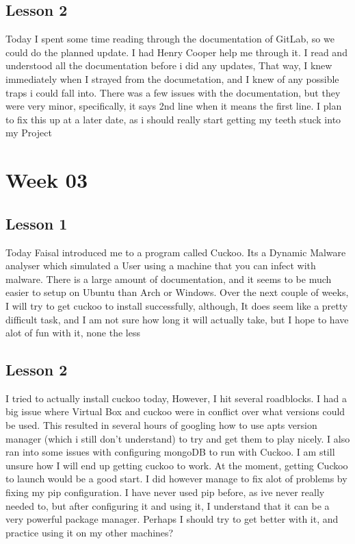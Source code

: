 \documentclass{article}
\begin{document}
\subsection{Lesson 2}
	Today I spent some time reading through the documentation of GitLab, so we could do the planned update. I had Henry Cooper help me through it. I read and understood all the documentation before i did any updates, That way, I knew immediately when I strayed from the documetation, and I knew of any possible traps i could fall into. There was a few issues with the documentation, but they were very minor, specifically, it says 2nd line when it means the first line. I plan to fix this up at a later date, as i should really start getting my teeth stuck into my Project
\section{Week 03}
\subsection{Lesson 1}
	Today Faisal introduced me to a program called Cuckoo. Its a Dynamic Malware analyser which simulated a User using a machine that you can infect with malware. There is a large amount of documentation, and it seems to be much easier to setup on Ubuntu than Arch or Windows. Over the next couple of weeks, I will try to get cuckoo to install successfully, although, It does seem like a pretty difficult task, and I am not sure how long it will actually take, but I hope to have alot of fun with it, none the less
\subsection{Lesson 2}
	I tried to actually install cuckoo today, However, I hit several roadblocks. I had a big issue where Virtual Box and cuckoo were in conflict over what versions could be used. This resulted in several hours of googling how to use apts version manager (which i still don't understand) to try and get them to play nicely. I also ran into some issues with configuring mongoDB to run with Cuckoo. I am still unsure how I will end up getting cuckoo to work. At the moment, getting Cuckoo to launch would be a good start. I did however manage to fix alot of problems by fixing my pip configuration. I have never used pip before, as ive never really needed to, but after configuring it and using it, I understand that it can be a very powerful package manager. Perhaps I should try to get better with it, and practice using it on my other machines?
\end{document}

